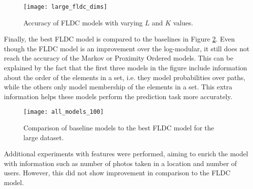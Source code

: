 \begin{figure}
  \centering
  \texttt{[image: large\_fldc\_dims]}
  \caption{Accuracy of FLDC models with varying $L$ and $K$ values.}
  \label{fig:grid_search_large}
\end{figure}

Finally, the best FLDC model is compared to the baselines in Figure \ref{fig:all_models_100}. Even though the FLDC model is an improvement over the log-modular, it still does not reach the accuracy of the Markov or Proximity Ordered models. This can be explained by the fact that the first three models in the figure include information about the order of the elements in a set, i.e. they model probabilities over paths, while the others only model membership of the elements in a set. This extra information helps these models perform the prediction task more accurately.

\begin{figure}
  \centering
  \texttt{[image: all\_models\_100]}
  \caption{Comparison of baseline models to the best FLDC model for the large dataset.}
  \label{fig:all_models_100}
\end{figure}

Additional experiments with features were performed, aiming to enrich the model with information such as number of photos taken in a location and number of users. However, this did not show improvement in comparison to the FLDC model.
